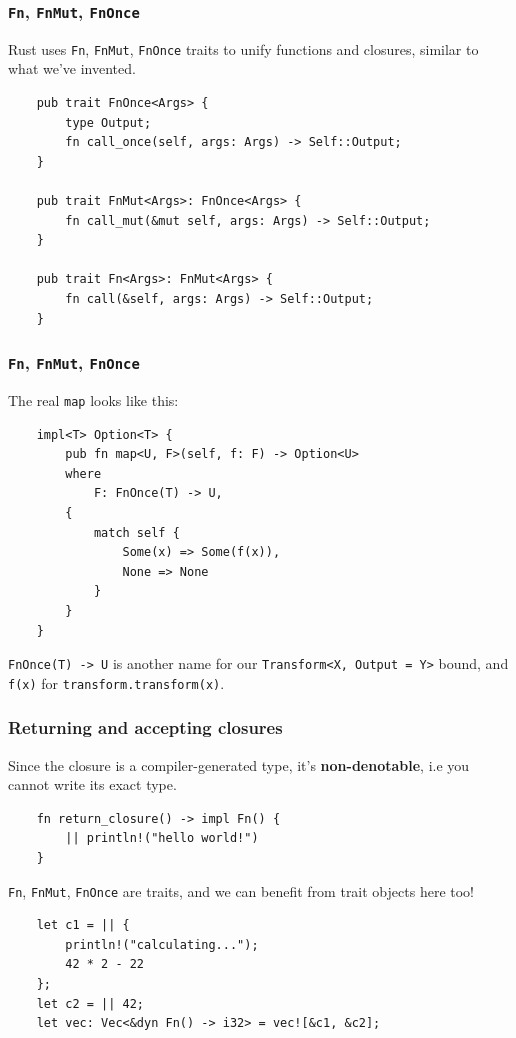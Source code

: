 \documentclass[aspectratio=1610,t]{beamer}
\begin{document}

\begin{frame}[fragile,c]
\frametitle{\texttt{Fn}, \texttt{FnMut}, \texttt{FnOnce}}
Rust uses \texttt{Fn}, \texttt{FnMut}, \texttt{FnOnce} traits to unify functions and closures, similar to what we've invented.

\begin{verbatim}
    pub trait FnOnce<Args> {
        type Output;
        fn call_once(self, args: Args) -> Self::Output;
    }

    pub trait FnMut<Args>: FnOnce<Args> {
        fn call_mut(&mut self, args: Args) -> Self::Output;
    }

    pub trait Fn<Args>: FnMut<Args> {
        fn call(&self, args: Args) -> Self::Output;
    }
\end{verbatim}

\end{frame}


\begin{frame}[fragile]
\frametitle{\texttt{Fn}, \texttt{FnMut}, \texttt{FnOnce}}
The real \texttt{map} looks like this:

\begin{verbatim}
    impl<T> Option<T> {
        pub fn map<U, F>(self, f: F) -> Option<U>
        where
            F: FnOnce(T) -> U,
        {
            match self {
                Some(x) => Some(f(x)),
                None => None
            }
        }
    }
\end{verbatim}

\texttt{FnOnce(T) -> U} is another name for our \texttt{Transform<X, Output = Y>} bound, and \texttt{f(x)} for \texttt{transform.transform(x)}.
\end{frame}


\begin{frame}[fragile,c]
\frametitle{Returning and accepting closures}
Since the closure is a compiler-generated type, it's \textbf{non-denotable}, i.e you cannot write its exact type.

\begin{verbatim}
    fn return_closure() -> impl Fn() {
        || println!("hello world!")
    }
\end{verbatim}

\texttt{Fn}, \texttt{FnMut}, \texttt{FnOnce} are traits, and we can benefit from trait objects here too!

\begin{verbatim}
    let c1 = || {
        println!("calculating...");
        42 * 2 - 22
    };
    let c2 = || 42;
    let vec: Vec<&dyn Fn() -> i32> = vec![&c1, &c2];
\end{verbatim}
\end{frame}
\end{document}
